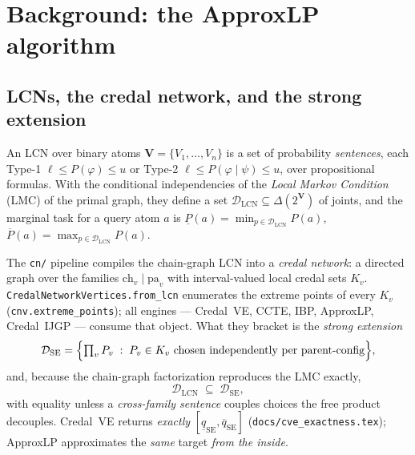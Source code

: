 \documentclass[11pt]{article}
\newcommand{\lo}{\underline}
\newcommand{\hi}{\overline}
\newcommand{\DSE}{\mathcal{D}_{\mathrm{SE}}}
\newcommand{\DLCN}{\mathcal{D}_{\mathrm{LCN}}}
\begin{document}
\tableofcontents

\section{Background: the ApproxLP algorithm}\label{sec:bg}

\subsection{LCNs, the credal network, and the strong extension}
An LCN over binary atoms $\mathbf V=\{V_1,\dots,V_n\}$ is a set of probability \emph{sentences},
each Type-1 $\ell\le P(\varphi)\le u$ or Type-2 $\ell\le P(\varphi\mid\psi)\le u$, over
propositional formulas. With the conditional independencies of the \emph{Local Markov Condition}
(LMC) of the primal graph, they define a set $\DLCN\subseteq\Delta(2^{\mathbf V})$ of joints, and the
marginal task for a query atom $a$ is $\lo P(a)=\min_{p\in\DLCN}P(a)$, $\hi P(a)=\max_{p\in\DLCN}
P(a)$.

The \texttt{cn/} pipeline compiles the chain-graph LCN into a \emph{credal network}: a directed
graph over the families $\mathrm{ch}_v\mid\mathrm{pa}_v$ with interval-valued local credal sets
$K_v$. \texttt{CredalNetworkVertices.from\_lcn} enumerates the extreme points of every $K_v$
(\texttt{cnv.extreme\_points}); all engines --- Credal~VE, CCTE, IBP, ApproxLP, Credal~IJGP ---
consume that object. What they bracket is the \emph{strong extension}
\begin{equation}\label{eq:se}
  \DSE=\Bigl\{\textstyle\prod_v P_v \;:\; P_v\in K_v \text{ chosen independently per parent-config}\Bigr\},
\end{equation}
and, because the chain-graph factorization reproduces the LMC exactly,
\begin{equation}\label{eq:incl}
  \DLCN\;\subseteq\;\DSE ,
\end{equation}
with equality unless a \emph{cross-family sentence} couples choices the free product decouples.
Credal~VE returns \emph{exactly} $[\lo q_{\mathrm{SE}},\hi q_{\mathrm{SE}}]$
(\texttt{docs/cve\_exactness.tex}); ApproxLP approximates the \emph{same} target \emph{from the
inside}.
\end{document}
